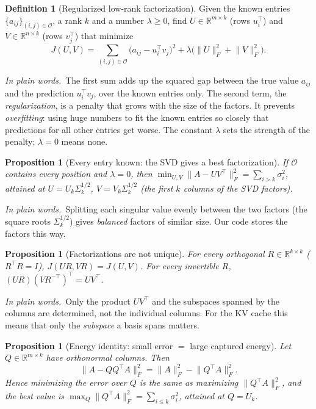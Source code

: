 \documentclass[10pt]{article}
\theoremstyle{plain}
\newtheorem{proposition}[theorem]{Proposition}
\theoremstyle{definition}
\newtheorem{definition}[theorem]{Definition}
\theoremstyle{remark}
\newcommand{\R}{\mathbb{R}}
\newcommand{\T}{^{\top}}
\newcommand{\fro}[1]{\lVert #1\rVert_F}
\newcommand{\obs}{\mathcal{O}}
\newcommand{\plain}{\noindent\emph{In plain words.}\ }
\begin{document}
\begin{definition}[Regularized low-rank factorization]\label{def:mf}
Given the known entries $\{a_{ij}\}_{(i,j)\in\obs}$, a rank $k$ and a number $\lambda\ge0$, find $U\in\R^{m\times k}$ (rows $u_i\T$) and $V\in\R^{n\times k}$ (rows $v_j\T$) that minimize
\begin{equation}\label{eq:J}
J(U,V)=\sum_{(i,j)\in\obs}\bigl(a_{ij}-u_i\T v_j\bigr)^2+\lambda\bigl(\fro{U}^2+\fro{V}^2\bigr).
\end{equation}
\end{definition}

\plain The first sum adds up the squared gap between the true value $a_{ij}$ and the prediction $u_i\T v_j$, over the known entries only. The second term, the \emph{regularization}, is a penalty that grows with the size of the factors. It prevents \emph{overfitting}: using huge numbers to fit the known entries so closely that predictions for all other entries get worse. The constant $\lambda$ sets the strength of the penalty; $\lambda=0$ means none.

\begin{proposition}[Every entry known: the SVD gives a best factorization]\label{prop:fullobs}
If $\obs$ contains every position and $\lambda=0$, then $\min_{U,V}\fro{A-UV\T}^2=\sum_{i>k}\sigma_i^2$, attained at $U=U_k\Sigma_k^{1/2}$, $V=V_k\Sigma_k^{1/2}$ (the first $k$ columns of the SVD factors).
\end{proposition}

\plain Splitting each singular value evenly between the two factors (the square roots $\Sigma_k^{1/2}$) gives \emph{balanced} factors of similar size. Our code stores the factors this way.

\begin{proposition}[Factorizations are not unique]\label{prop:nonuniq}
For every orthogonal $R\in\R^{k\times k}$ ($R\T R=I$), $J(UR,VR)=J(U,V)$. For every invertible $R$, $(UR)(VR^{-\top})\T=UV\T$.
\end{proposition}

\plain Only the product $UV\T$ and the subspaces spanned by the columns are determined, not the individual columns. For the KV cache this means that only the \emph{subspace} a basis spans matters.

\begin{proposition}[Energy identity: small error $=$ large captured energy]\label{prop:energy}
Let $Q\in\R^{m\times k}$ have orthonormal columns. Then
\[
\fro{A-QQ\T A}^2=\fro{A}^2-\fro{Q\T A}^2 .
\]
Hence minimizing the error over $Q$ is the same as maximizing $\fro{Q\T A}^2$, and the best value is $\max_Q\fro{Q\T A}^2=\sum_{i\le k}\sigma_i^2$, attained at $Q=U_k$.
\end{proposition}
\end{document}
